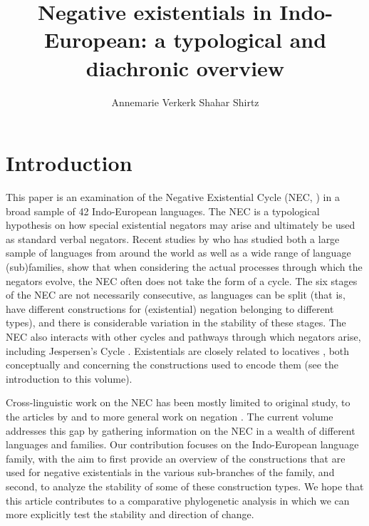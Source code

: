 ﻿\documentclass[output=paper]{langsci/langscibook}
\title{Negative existentials in Indo-European: a typological and diachronic overview}
\author{Annemarie Verkerk\affiliation{Max Planck Institute for the Science
of Human History\\ Universität des Saarlandes}\lastand
Shahar Shirtz\affiliation{University of Oregon}%
}
\begin{document}
\section{Introduction}\label{sec:ieur-1}

This paper is an examination of the Negative Existential Cycle (NEC,
\citealt{Croft1991}) in a broad sample of 42
Indo-European languages. The
NEC is a typological hypothesis on how special existential negators may
arise and ultimately be used as standard verbal negators. Recent studies by
\textcites{Veselinova2013}{Veselinova2014}{Veselinova2015}{Veselinova2016} who has studied both a large sample of
languages from around the world as well as a wide range of language
(sub)families, show that when considering the actual processes through
which the negators evolve, the NEC often does not take the form of a cycle.
The six stages of the NEC are not necessarily consecutive, as languages can
be split (that is, have different constructions for (existential) negation
belonging to different types), and there is considerable variation in the
stability of these stages. The NEC also interacts with other cycles and
pathways through which negators arise, including Jespersen's Cycle
\parencite[see][]{Gelderen2019}. Existentials are closely related to
locatives \parencites{Clark1978}{Creissels2013ieur}, both conceptually and
concerning the constructions used to encode them (see the introduction to
this volume). 

Cross-linguistic work on the NEC has been mostly limited to
 original study, to the articles by
\textcites{Veselinova2013}{Veselinova2014}{Veselinova2015}{Veselinova2016}
    and to more general work on negation 
\parencites{KahrelBerg1994}{CyfferEbermann2009}{Budd2010}{WillisLucas2013-ieur}.
The current volume addresses this gap by gathering information on the NEC
in a wealth of different languages and
families. Our contribution focuses on the Indo-European language family,
with the aim to first provide an overview of the constructions that are
used for negative existentials in the various sub-branches of the family,
and second, to analyze the stability of some of these construction types.
We hope that this article contributes to a comparative phylogenetic
analysis in which we can more explicitly test the stability and direction
of change. 
\end{document}
